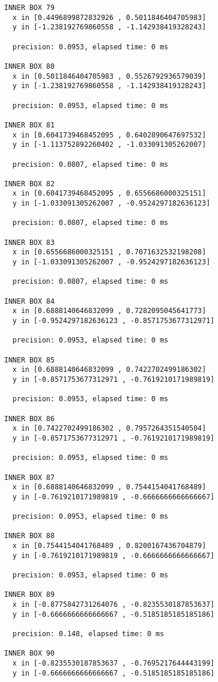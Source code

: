 \begin{verbatim}
INNER BOX 79
  x in [0.4496899872832926 , 0.5011846404705983]
  y in [-1.238192769860558 , -1.142938419328243]

  precision: 0.0953, elapsed time: 0 ms

INNER BOX 80
  x in [0.5011846404705983 , 0.5526792936579039]
  y in [-1.238192769860558 , -1.142938419328243]

  precision: 0.0953, elapsed time: 0 ms

INNER BOX 81
  x in [0.6041739468452095 , 0.6402890647697532]
  y in [-1.113752892260402 , -1.033091305262007]

  precision: 0.0807, elapsed time: 0 ms

INNER BOX 82
  x in [0.6041739468452095 , 0.6556686000325151]
  y in [-1.033091305262007 , -0.9524297182636123]

  precision: 0.0807, elapsed time: 0 ms

INNER BOX 83
  x in [0.6556686000325151 , 0.7071632532198208]
  y in [-1.033091305262007 , -0.9524297182636123]

  precision: 0.0807, elapsed time: 0 ms

INNER BOX 84
  x in [0.6888140646832099 , 0.7282095045641773]
  y in [-0.9524297182636123 , -0.8571753677312971]

  precision: 0.0953, elapsed time: 0 ms

INNER BOX 85
  x in [0.6888140646832099 , 0.7422702499186302]
  y in [-0.8571753677312971 , -0.7619210171989819]

  precision: 0.0953, elapsed time: 0 ms

INNER BOX 86
  x in [0.7422702499186302 , 0.7957264351540504]
  y in [-0.8571753677312971 , -0.7619210171989819]

  precision: 0.0953, elapsed time: 0 ms

INNER BOX 87
  x in [0.6888140646832099 , 0.7544154041768489]
  y in [-0.7619210171989819 , -0.6666666666666667]

  precision: 0.0953, elapsed time: 0 ms

INNER BOX 88
  x in [0.7544154041768489 , 0.8200167436704879]
  y in [-0.7619210171989819 , -0.6666666666666667]

  precision: 0.0953, elapsed time: 0 ms

INNER BOX 89
  x in [-0.8775842731264076 , -0.8235530187853637]
  y in [-0.6666666666666667 , -0.5185185185185186]

  precision: 0.148, elapsed time: 0 ms

INNER BOX 90
  x in [-0.8235530187853637 , -0.7695217644443199]
  y in [-0.6666666666666667 , -0.5185185185185186]


\end{verbatim}
